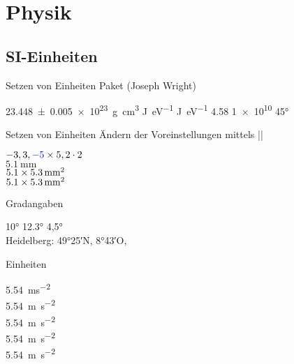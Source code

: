 \documentclass[
	vorläufig=false,
	datum=2022-11-09,
	titel={Mathematiksatz},
	web=false,
	max,
	aspectratio=1610,
]{../tex/latexkurs-slides}
\begin{document}

\section{Physik}
\subsection{SI-Einheiten}
\begin{frame}[fragile]{Setzen von Einheiten}
Paket  (Joseph Wright)
\begin{LTXexample}[preset={\obeylines},pos=r]
\SI[separate-uncertainty]{23.448(5)e23}{g.cm^3}
\si[per-mode=fraction]{\joule\per\eV}
\si{\joule\per\eV}
\num[mode=text]{4.58}
\num[exponent-product=\cdot]{1e10}
\ang[]{45}
\end{LTXexample}
\end{frame}

\begin{frame}[fragile]{Setzen von Einheiten}
Ändern der Voreinstellungen mittels |\sisetup|
\begin{LTXexample}
\(\num{-3}, \num{3},
\numproduct[negative-color=blue]{-5x5},
\num{2}\cdot\num 2\)\\

\def\a{5.1}
\(\SI{\a}{\milli\meter}\)\\
\(\numproduct{\a x 5.3}\,\si{\square\milli\meter}\)\\
\(\numproduct{\a x 5.3}\,\si{\milli\meter
\squared}\)
\end{LTXexample}
\end{frame}

\begin{frame}[fragile]{Gradangaben}
\begin{LTXexample}
\ang{10}
\ang{12.3}
\ang{4,5}
\\ Heidelberg:
\ang{49;25;}N, \ang{8;43;}O,
\end{LTXexample}
\end{frame}

\begin{frame}[fragile]{Einheiten}
\begin{LTXexample}[preset=\large]
\SI{5.54}{ms^{-2}}\\
\SI{5.54}{m s^{-2}}\\
\SI{5.54}{m.s^{-2}}\\
\SI{5.54}{\meter\per \second\squared}\\
\SI{5.54}{\meter\per \square\second}\\
\end{LTXexample}
\end{frame}
\end{document}
